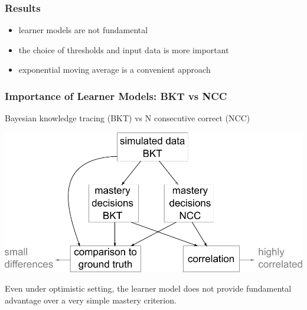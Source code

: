\documentclass[bigger]{beamer}
\begin{document}
\begin{frame}
  \frametitle{Results}

  \begin{itemize}
  \item learner models are not fundamental
  \item the choice of thresholds and input data is more important
  \item exponential moving average is a convenient approach
  \end{itemize}
\end{frame}

\begin{frame}
  \frametitle{Importance of Learner Models: BKT vs NCC}

  {\small
  Bayesian knowledge tracing (BKT) vs N consecutive correct (NCC)}

  \smallskip

  \begin{center}
    \includegraphics[width=.7\linewidth]{bkt-ncc-experiment}
  \end{center}


  \begin{block}{}
    Even under optimistic setting, the learner model does not provide
    fundamental advantage over a very simple mastery criterion.
  \end{block}
\end{frame}
\end{document}
